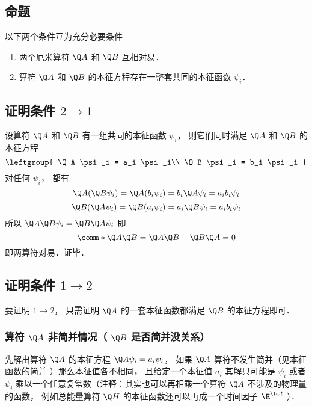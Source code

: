 

\subsection{命题}
以下两个条件互为充分必要条件
\begin{enumerate}
\item 两个厄米算符 $\Q A$ 和 $\Q B$ 互相对易．
\item 算符 $\Q A$ 和 $\Q B$ 的本征方程存在一整套共同的本征函数 $\psi _i$．
\end{enumerate}

\subsection{证明条件 $2 \to 1$}
设算符 $\Q A$ 和 $\Q B$ 有一组共同的本征函数 $\psi _i$，  则它们同时满足 $\Q A$ 和 $\Q B$ 的本征方程
\begin{equation}
\leftgroup{
\Q A \psi _i = a_i \psi _i\\
\Q B \psi _i = b_i \psi _i
}\end{equation}
对任何 $\psi_i$，  都有
\begin{equation}
\Q A (\Q B \psi_i) = \Q A (b_i \psi_i) = b_i\Q A \psi _i = a_i b_i \psi_i
\end{equation}
\begin{equation}
\Q B (\Q A \psi _i) = \Q B (a_i \psi _i) = a_i \Q B \psi _i = a_i b_i \psi _i
\end{equation}
所以 $\Q A\Q B \psi _i = \Q B\Q A \psi _i$ 即
\begin{equation}
\comm*{\Q A}{\Q B} = \Q A\Q B - \Q B\Q A = 0
\end{equation}
即两算符对易．证毕．

\subsection{证明条件 $1 \to 2$}
要证明 $1 \to 2$，  只需证明 $\Q A$ 的一套本征函数都满足 $\Q B$ 的本征方程即可．

\subsubsection{算符 $\Q A$ 非简并情况（ $\Q B$ 是否简并没关系）}
先解出算符 $\Q A$ 的本征方程 $\Q A \psi _i = a_i \psi _i$，  如果 $\Q A$ 算符不发生简并（见本征函数的简并%
  ）那么本征值各不相同， 且给定一个本征值 $a_i$ 其解只可能是 $\psi _i$ 或者 $\psi _i$ 乘以一个任意复常数（注释：其实也可以再相乘一个算符 $\Q A$ 不涉及的物理量的函数， 例如总能量算符 $\Q H$ 的本征函数还可以再成一个时间因子 $\E^{\I\omega t}$ ）．

